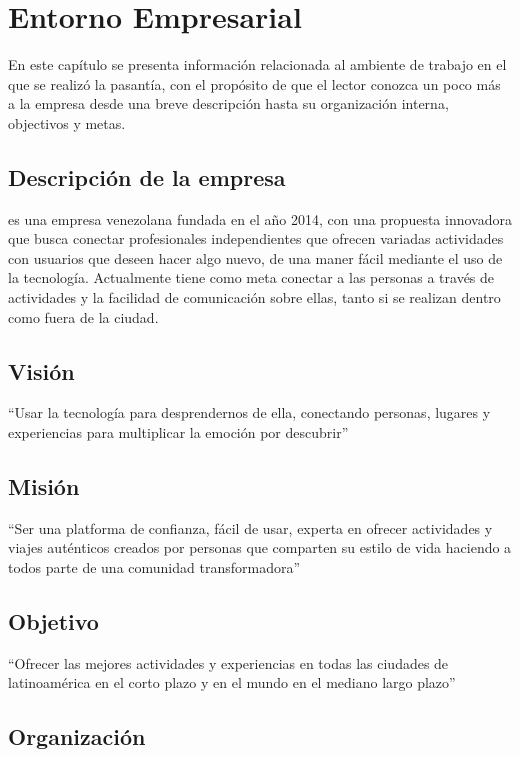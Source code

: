\chapter{Entorno Empresarial}

En este capítulo se presenta información relacionada al ambiente de trabajo en el que se realizó la pasantía, con el propósito de que el lector conozca un poco más a la empresa \business desde una breve descripción hasta su organización interna, objectivos y metas.

\section{Descripción de la empresa}

\business es una empresa venezolana fundada en el año 2014, con una propuesta innovadora que busca conectar profesionales independientes que ofrecen variadas actividades con usuarios que deseen hacer algo nuevo, de una maner fácil mediante el uso de la tecnología. Actualmente tiene como meta conectar a las personas a través de actividades y la facilidad de comunicación sobre ellas, tanto si se realizan dentro como fuera de la ciudad.

\section{Visión}

``Usar la tecnología para desprendernos de ella, conectando personas, lugares y experiencias para multiplicar la emoción por descubrir''

\section{Misión}

``Ser una platforma de confianza, fácil de usar, experta en ofrecer actividades y viajes auténticos creados por personas que comparten su estilo de vida haciendo a todos parte de una comunidad transformadora''

\section{Objetivo}

``Ofrecer las mejores actividades y experiencias en todas las ciudades de latinoamérica en el corto plazo y en el mundo en el mediano largo plazo''

\section{Organización}

